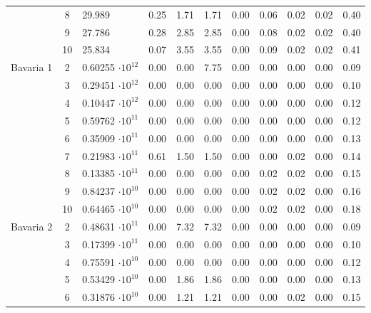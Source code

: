 {\begin{longtable}{@{}lclcccccccc@{}}
                      & 8  & 29.989          & 0.25    & 1.71  & 1.71  & 0.00  & 0.06    & 0.02 & 0.02 & 0.40  \\
                      & 9  & 27.786          & 0.28    & 2.85  & 2.85  & 0.00  & 0.08    & 0.02 & 0.02 & 0.40  \\
                      & 10 & 25.834          & 0.07    & 3.55  & 3.55  & 0.00  & 0.09    & 0.02 & 0.02 & 0.41  \\ \hline
Bavaria 1             & 2  & 0.60255 $\cdot 10^{12}$ & 0.00    & 0.00  & 7.75  & 0.00  & 0.00    & 0.00 & 0.00 & 0.09  \\
                      & 3  & 0.29451 $\cdot 10^{12}$ & 0.00    & 0.00  & 0.00  & 0.00  & 0.00    & 0.00 & 0.00 & 0.10  \\
                      & 4  & 0.10447 $\cdot 10^{12}$ & 0.00    & 0.00  & 0.00  & 0.00  & 0.00    & 0.00 & 0.00 & 0.12  \\
                      & 5  & 0.59762 $\cdot 10^{11}$ & 0.00    & 0.00  & 0.00  & 0.00  & 0.00    & 0.00 & 0.00 & 0.12  \\
                      & 6  & 0.35909 $\cdot 10^{11}$ & 0.00    & 0.00  & 0.00  & 0.00  & 0.00    & 0.00 & 0.00 & 0.13  \\
                      & 7  & 0.21983 $\cdot 10^{11}$ & 0.61    & 1.50  & 1.50  & 0.00  & 0.00    & 0.02 & 0.00 & 0.14  \\
                      & 8  & 0.13385 $\cdot 10^{11}$ & 0.00    & 0.00  & 0.00  & 0.00  & 0.02    & 0.02 & 0.00 & 0.15  \\
                      & 9  & 0.84237 $\cdot 10^{10}$ & 0.00    & 0.00  & 0.00  & 0.00  & 0.02    & 0.02 & 0.00 & 0.16  \\
                      & 10 & 0.64465 $\cdot 10^{10}$ & 0.00    & 0.00  & 0.00  & 0.00  & 0.02    & 0.02 & 0.00 & 0.18  \\ \hline
Bavaria 2             & 2  & 0.48631 $\cdot 10^{11}$ & 0.00    & 7.32  & 7.32  & 0.00  & 0.00    & 0.00 & 0.00 & 0.09  \\
                      & 3  & 0.17399 $\cdot 10^{11}$ & 0.00    & 0.00  & 0.00  & 0.00  & 0.00    & 0.00 & 0.00 & 0.10  \\
                      & 4  & 0.75591 $\cdot 10^{10}$ & 0.00    & 0.00  & 0.00  & 0.00  & 0.00    & 0.00 & 0.00 & 0.12  \\
                      & 5  & 0.53429 $\cdot 10^{10}$ & 0.00    & 1.86  & 1.86  & 0.00  & 0.00    & 0.00 & 0.00 & 0.13  \\
                      & 6  & 0.31876 $\cdot 10^{10}$ & 0.00    & 1.21  & 1.21  & 0.00  & 0.00    & 0.02 & 0.00 & 0.15  \\

\end{longtable}}

